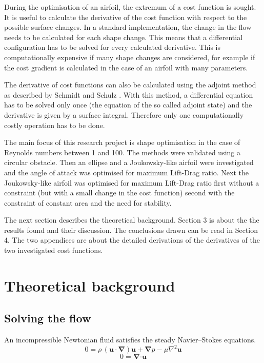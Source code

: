 \documentclass[12pt, a4paper]{article}
\begin{document}
        During the optimisation of an airfoil, the extremum of a cost function is sought. It is useful to calculate the derivative of the cost function with respect to the possible surface changes. In a standard implementation, the change in the flow needs to be calculated for each shape change. This means that a differential configuration has to be solved for every calculated derivative. This is computationally expensive if many shape changes are considered, for example if the cost gradient is calculated in the case of an airfoil with many parameters.
        
        The derivative of cost functions can also be calculated using the adjoint method as described by Schmidt and Schulz \cite{Schmidt_1}. With this method, a differential equation has to be solved only once (the equation of the so called adjoint state) and the derivative is given by a surface integral. Therefore only one computationally costly operation has to be done.
        
        The main focus of this research project is shape optimisation in the case of Reynolds numbers between 1 and 100. The methods were validated using a circular obstacle. Then an ellipse and a Joukowsky-like airfoil were investigated and the angle of attack was optimised for maximum Lift-Drag ratio. Next the Joukowsky-like airfoil was optimised for maximum Lift-Drag ratio first without a constraint (but with a small change in the cost function) second with the constraint of constant area and the need for stability.
        
        The next section describes the theoretical background. Section 3 is about the the results found and their discussion. The conclusions drawn can be read in Section 4. The two appendices are about the detailed derivations of the derivatives of the two investigated cost functions.
        
\section{Theoretical background}
    \subsection{Solving the flow}
    An incompressible Newtonian fluid satisfies the steady Navier--Stokes equations.
    \begin{equation} \label{NS_1}
    0 = \rho \, (\mathbf{u \cdot} \boldsymbol{\nabla}) \mathbf{u} + \boldsymbol{\nabla} p - 
    \mu \nabla^2 \mathbf{u}
    \end{equation}
    \begin{equation} \label{NS_2}
    0 = \boldsymbol{\nabla} \mathbf{\cdot u}
    \end{equation}
    
\end{document}
